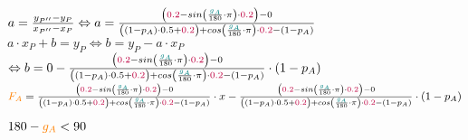 \documentclass[10pt]{article}
\begin{document}
\vspace{.5cm}

\begin{center}

        $a = \frac{y_{P''} - y_{P}}{x_{P''} - x_{P}} \Leftrightarrow a = \frac{\left(\color{purple}0.2\color{black} - sin\left(\frac{\color{teal}g_{A}\color{black}}{180}\cdot \pi\right)\cdot \color{purple}0.2\color{black}\right) - 0}{\left(\left(1 - p_{A}\right)\cdot 0.5 + \color{purple}0.2\color{black}\right) + cos\left(\frac{\color{teal}g_{A}\color{black}}{180}\cdot \pi\right)\cdot \color{purple}0.2\color{black} - \left(1 - p_{A}\right)}$ \\[.5cm]

        $a\cdot x_{P} + b = y_{P} \Leftrightarrow b = y_{P} - a\cdot x_{P}$ \\[.5cm]

        $\Leftrightarrow b = 0 - \frac{\left(\color{purple}0.2\color{black} - sin\left(\frac{\color{teal}g_{A}\color{black}}{180}\cdot \pi\right)\cdot \color{purple}0.2\color{black}\right) - 0}{\left(\left(1 - p_{A}\right)\cdot 0.5 + \color{purple}0.2\color{black}\right) + cos\left(\frac{\color{teal}g_{A}\color{black}}{180}\cdot \pi\right)\cdot \color{purple}0.2\color{black} - \left(1 - p_{A}\right)}\cdot \left(1 - p_{A}\right)$ \\[1cm]

        $\color{orange}F_{A}\color{black} = \frac{\left(\color{purple}0.2\color{black} - sin\left(\frac{\color{teal}g_{A}\color{black}}{180}\cdot \pi\right)\cdot \color{purple}0.2\color{black}\right) - 0}{\left(\left(1 - p_{A}\right)\cdot 0.5 + \color{purple}0.2\color{black}\right) + cos\left(\frac{\color{teal}g_{A}\color{black}}{180}\cdot \pi\right)\cdot \color{purple}0.2\color{black} - \left(1 - p_{A}\right)}\cdot x - \frac{\left(\color{purple}0.2\color{black} - sin\left(\frac{\color{teal}g_{A}\color{black}}{180}\cdot \pi\right)\cdot \color{purple}0.2\color{black}\right) - 0}{\left(\left(1 - p_{A}\right)\cdot 0.5 + \color{purple}0.2\color{black}\right) + cos\left(\frac{\color{teal}g_{A}\color{black}}{180}\cdot \pi\right)\cdot \color{purple}0.2\color{black} - \left(1 - p_{A}\right)}\cdot \left(1 - p_{A}\right)$

\end{center}

\newpage

\uline{$180 - \color{orange}g_{A}\color{black} < 90$}
\end{document}
